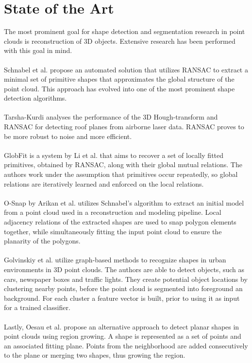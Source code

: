 \section{State of the Art}
The most prominent goal for shape detection and segmentation research in point clouds is reconstruction of 3D objects. Extensive research has been performed with this goal in mind. 
\\
\\
Schnabel et al. \cite{schnabel-2007-efficient} propose an automated solution that utilizes RANSAC to extract a minimal set of primitive shapes that approximates the global structure of the point cloud. This approach has evolved into one of the most prominent shape detection algorithms.
\\
\\
Tarsha-Kurdi \cite{tarsha2007hough} analyses the performance of the 3D Hough-transform and RANSAC for detecting roof planes from airborne laser data. RANSAC proves to be more robust to noise and more efficient.
\\
\\
GlobFit is a system by Li et al. \cite{li2011globfit} that aims to recover a set of locally fitted primitives, obtained by RANSAC, along with their global mutual relations. The authors work under the assumption that primitives occur repeatedly, so global relations are iteratively learned and enforced on the local relations. 
\\
\\
O-Snap by Arikan et al. \cite{arikan-2013-osn} utilizes Schnabel's algorithm to extract an initial model from a point cloud used in a reconstruction and modeling pipeline. Local adjacency relations of the extracted shapes are used to snap polygon elements together, while simultaneously fitting the input point cloud to ensure the planarity of the polygons. 
\\
\\
Golvinskiy et al. \cite{golovinskiy2009shape} utilize graph-based methods to recognize shapes in urban environments in 3D point clouds. The authors are able to detect objects, such as cars, newspaper boxes and traffic lights. They create potential object locations by clustering nearby points, before the point cloud is segmented into foreground an background. For each cluster a feature vector is built, prior to using it as input for a trained classifier. 
\\
\\
Lastly, Oesau et al. \cite{oesau2016planar} propose an alternative approach to detect planar shapes in point clouds using region growing. A shape is represented as a set of points and an associated fitting plane. Points from the neighborhood are added consecutively to the plane or merging two shapes, thus growing the region. 


